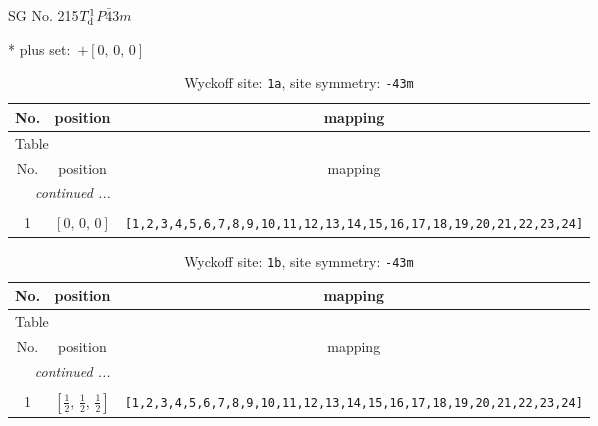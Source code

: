 \documentclass[fleqn,8pt]{jsarticle}
\begin{document}
\setcounter{MaxMatrixCols}{32}

\renewcommand{\tablename}{Table~}
\renewcommand{\figurename}{Figure~}
\begin{center}
\LARGE
SG No. 215\quad$T_{\rm d}^{1}$\quad$P\bar{4}3m$\quad[ cubic ]
\end{center}
* plus set:\,\,\,$+\left[ 0,\, 0,\, 0 \right]$
\renewcommand{\arraystretch}{1.2}
\begin{longtable}{ccc}
\caption{Wyckoff site: {\tt 1a}, site symmetry: {\tt -43m}}
 \\
 \hline \hline
No. & position & mapping \\ \hline \endfirsthead

\multicolumn{2}{l}{\tablename\ \thetable{}} \\
 \hline \hline
No. & position & mapping \\ \hline \endhead

 \hline \hline
\multicolumn{2}{r}{\footnotesize\it continued ...} \\ \endfoot

 \hline \hline
\multicolumn{2}{r}{} \\ \endlastfoot

1 & $\left[ 0,\, 0,\, 0 \right]$ & {\tt [1,2,3,4,5,6,7,8,9,10,11,12,13,14,15,16,17,18,19,20,21,22,23,24]} \\
\end{longtable}
\renewcommand{\arraystretch}{1.2}
\begin{longtable}{ccc}
\caption{Wyckoff site: {\tt 1b}, site symmetry: {\tt -43m}}
 \\
 \hline \hline
No. & position & mapping \\ \hline \endfirsthead

\multicolumn{2}{l}{\tablename\ \thetable{}} \\
 \hline \hline
No. & position & mapping \\ \hline \endhead

 \hline \hline
\multicolumn{2}{r}{\footnotesize\it continued ...} \\ \endfoot

 \hline \hline
\multicolumn{2}{r}{} \\ \endlastfoot

1 & $\left[ \frac{1}{2},\, \frac{1}{2},\, \frac{1}{2} \right]$ & {\tt [1,2,3,4,5,6,7,8,9,10,11,12,13,14,15,16,17,18,19,20,21,22,23,24]} \\
\end{longtable}
\renewcommand{\arraystretch}{1.2}
\end{document}
